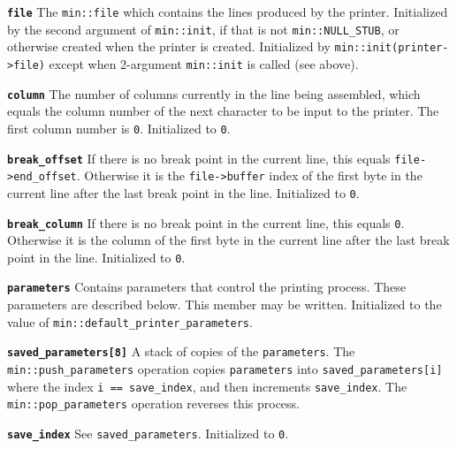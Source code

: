 \documentclass[12pt]{article}
\makeatletter
\newcommand{\ttmkey}[2]{{\tt \bf #1}\index{#1@{\tt #1}!#2}}
\newcommand{\EOL}{\penalty \exhyphenpenalty}
\newenvironment{itemlist}[1][1.2in]%
	{\begin{list}{}{\setlength{\labelwidth}{#1}%
		        \setlength{\leftmargin}{\labelwidth}%
		        \addtolength{\leftmargin}{+0.2in}%
		        \renewcommand{\makelabel}[1]{##1\hfill}}}%
	{\end{list}}
\makeatother
\begin{document}
\begin{itemlist}[0.8in]

\item[\ttmkey{file}{in {\tt min::printer}}]
The {\tt min::file} which contains the lines produced by the printer.
Initialized by the second argument of {\tt min::\EOL init}, if that is
not {\tt min::\EOL NULL\_\EOL STUB}, or otherwise created when the
printer is created.  Initialized by {\tt min::\EOL init(printer->\EOL file)}
except when 2-argument {\tt min::init} is called (see above).

\item[\ttmkey{column}{in {\tt min::printer}}]
The number of columns currently in the line being assembled,
which equals the column number of the next character to be input to the
printer.  The first column number is {\tt 0}.  Initialized to {\tt 0}.

\end{itemlist}

\begin{itemlist}[1.2in]

\item[\ttmkey{break\_\EOL offset}{in {\tt min::printer}}]
If there is no break point in the current line, this equals
{\tt file->\EOL end\_\EOL offset}.
Otherwise it is the {\tt file->buffer} index of the
first byte in the current line after the last break point in the line.
Initialized to {\tt 0}.

\item[\ttmkey{break\_\EOL column}{in {\tt min::printer}}]
If there is no break point in the current line, this equals {\tt 0}.
Otherwise it is the column of the
first byte in the current line after the last break point in the line.
Initialized to {\tt 0}.

\end{itemlist}

\begin{itemlist}[1.6in]

\item[\ttmkey{parameters}{in {\tt min::printer}}]
Contains parameters that control the printing process.
These parameters are described below.
This member may be written.
Initialized to the value of
{\tt min::\EOL default\_\EOL printer\_\EOL parameters}.

\item[\ttmkey{saved\_\EOL parameters[8]}{in {\tt min::printer}}]
A stack of copies of the {\tt parameters}.
The {\tt min::push\_\EOL parameters} operation copies
{\tt parameters} into {\tt saved\_\EOL parameters[i]} where
the index {\tt i~== save\_\EOL index}, and then
increments {\tt save\_\EOL index}.
The {\tt min::pop\_\EOL parameters} operation reverses this process.

\item[\ttmkey{save\_\EOL index}{in {\tt min::printer}}]
See {\tt saved\_parameters}.  Initialized to {\tt 0}.

\end{itemlist}
\end{document}
